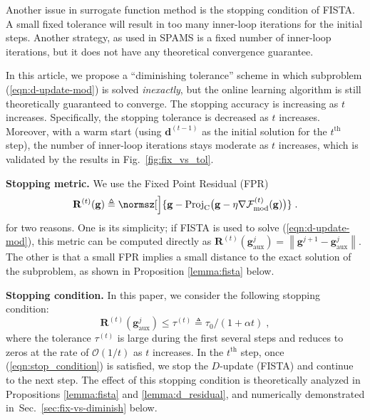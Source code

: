\documentclass[final]{siamart1116}
\newcommand{\fig}[1]{Fig.~\ref{fig:#1}}
\newcommand{\sctn}[1]{Sec.~\ref{sec:#1}}
\newcommand{\mb}[1]{\mathbf{#1}}
\providecommand{\norm}[1]{\left\lVert#1\right\rVert}
\def \co {\mathcal{O}}
\def \F  {\mathcal{F}}
\def \fpr {\mathbf{R}}
\begin{document}
Another issue in surrogate function method is the stopping condition of FISTA.  A small fixed tolerance will result in too many inner-loop iterations for the initial steps. Another strategy, as used in SPAMS \cite{mairal2009online, jenatton2010proximal} is a fixed number of inner-loop iterations, but it does not have any theoretical convergence guarantee.

In this article, we propose a ``diminishing tolerance'' scheme in which subproblem (\ref{eqn:d-update-mod}) is solved \emph{inexactly}, but the online learning algorithm is still theoretically guaranteed to converge.
The stopping accuracy is increasing as $t$ increases.
Specifically, the stopping tolerance is decreased as $t$ increases. Moreover, with a warm start (using $\mb{d}^{(t-1)}$ as the initial solution for the $t^{\text{th}}$ step), the number of inner-loop iterations stays moderate as $t$ increases, which is validated by the results in \fig{fix_vs_tol}.


\textbf{Stopping metric.} We use the Fixed Point Residual (FPR) \cite{davis2016convergence}
\begin{equation}
\label{eq:fpr}
\fpr^{(t)}(\mb{g}) \triangleq \normsz[\Big]{ \mb{g} - \text{Proj}_{\text{C}}\big(\mb{g}-\eta\nabla \F_{\mathrm{mod}}^{(t)}(\mb{g})\big)} \;.
\end{equation}
for two reasons. One is its simplicity; if FISTA is used to solve (\ref{eqn:d-update-mod}), this metric can be computed directly as $\fpr^{(t)}(\mb{g}^{j}_{\text{aux}}) = \norm{\mb{g}^{j+1}-\mb{g}^j_{\text{aux}}}$. The other is that a small FPR implies a small distance to the exact solution of the subproblem, as shown in Proposition \ref{lemma:fista} below.

\textbf{Stopping condition.} In this paper, we consider the following stopping condition:
\begin{equation}
\label{eqn:stop_condition}
\fpr^{(t)}(\mb{g}^{j}_{\text{aux}}) \leq \tau^{(t)} \triangleq \tau_0 / (1 + \alpha t) \;,
\end{equation}
where the tolerance $\tau^{(t)}$ is large during the first several steps and reduces to zeros at the rate of $\co(1/t)$ as $t$ increases.  In the $t^{\text{th}}$ step, once (\ref{eqn:stop_condition}) is satisfied, we stop the $D$-update (FISTA) and continue to the next step. The effect of this stopping condition is theoretically analyzed in Propositions \ref{lemma:fista} and \ref{lemma:d_residual}, and numerically demonstrated in~\sctn{fix-vs-diminish} below.
\end{document}
